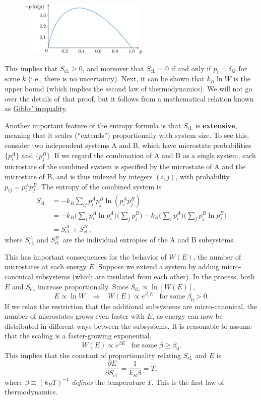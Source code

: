 \documentclass[pra,12pt]{revtex4}
\begin{document}
\begin{figure}[h]
  \centering\includegraphics[width=0.55\textwidth]{plogp}
\end{figure}

This implies that $S_{\mathrm{cl.}}\ge 0$, and moreover that
$S_{\mathrm{cl.}} = 0$ if and only if $p_i = \delta_{ik}$ for some $k$
(i.e., there is no uncertainty).  Next, it can be shown that $k_B \ln
W$ is the upper bound (which implies the second law of
thermodynamics).  We will not go over the details of that proof, but
it follows from a mathematical relation known as
\href{https://en.wikipedia.org/wiki/Gibbs\%27_inequality}{Gibbs'
  inequality}.

Another important feature of the entropy formula is that
$S_{\mathrm{cl.}}$ is \textbf{extensive}, meaning that it scales
(``extends'') proportionally with system size.  To see this, consider
two independent systems A and B, which have microstate probabilities
$\{p_i^A\}$ and $\{p_j^B\}$.  If we regard the combination of A and B
as a single system, each microstate of the combined system is
specified by the microstate of A and the microstate of B, and is thus
indexed by integers $(i,j)$, with probability $p_{ij} = p^A_ip^B_j$.
The entropy of the combined system is
$$\begin{aligned}S_{\mathrm{cl.}} &= - k_B \sum_{ij} p_i^Ap^B_j \ln\left(p^A_ip^B_j\right) \\
  &= - k_B \Big(\sum_{i} p^A_i \ln p^A_i\Big)\Big(\sum_j p^B_j\Big)
  - k_B \Big(\sum_{i} p^A_i \Big) \Big(\sum_j p^B_j \ln p^B_j\Big) \\
  &= S_{\mathrm{cl.}}^A + S_{\mathrm{cl.}}^B,
\end{aligned}$$
where $S_{\mathrm{cl.}}^A$ and $S_{\mathrm{cl.}}^B$ are the individual
entropies of the A and B subsystems.

This has important consequences for the behavior of $W(E)$, the number
of microstates at each energy $E$.  Suppose we extend a system by
adding micro-canonical subsystems (which are insulated from each
other).  In the process, both $E$ and $S_{\mathrm{cl.}}$ increase
proportionally.  Since $S_{\mathrm{cl.}} \propto \ln[W(E)]$,
$$E \propto \ln W \;\;\;\Rightarrow \;\;\;W(E) \propto e^{\beta_0 E} \;\;\; \mathrm{for\;some}\; \beta_0 > 0.$$
If we relax the restriction that the additional subsystems are
micro-canonical, the number of microstates grows even faster with $E$,
as energy can now be distributed in different ways between the
subsystems.  It is reasonable to assume that the scaling is a
faster-growing exponential,
$$W(E) \propto e^{\beta E} \;\;\; \mathrm{for\;some}\; \beta \ge \beta_0.$$
This implies that the constant of proportionality relating
$S_{\mathrm{cl.}}$ and $E$ is
$$\frac{\partial E}{\partial S_{\mathrm{cl.}}} = \frac{1}{k_B \beta} = T,$$
where $\beta \equiv (k_BT)^{-1}$ \textit{defines} the temperature $T$.
This is the first law of thermodynamics.
\end{document}
